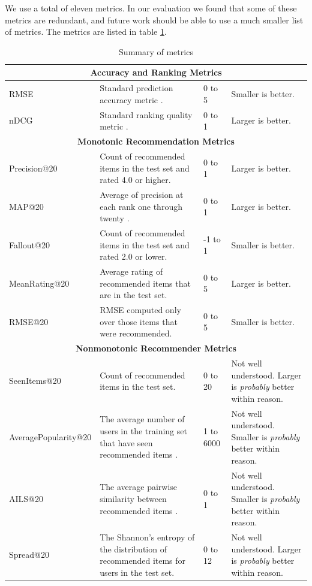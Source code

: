\documentclass[letterpaper]{sig-alternate}
\begin{document}
  We use a total of eleven metrics.
  In our evaluation we found that some of these metrics are redundant, and future work should be able to use a much smaller list of metrics.
  The metrics are listed in table \ref{tbl:metrics}.
  \begin{table}[ht!]
    \centering
    \begin{tabular}{|p{7em}|p{20em}|p{4em}|p{18em}|}
      \hline
      \multicolumn{4}{|c|}{{\bf Accuracy and Ranking Metrics}} \\\hline
      RMSE                   & Standard prediction accuracy metric \cite{handbook}. & 0 to 5 & Smaller is better. \\\hline
      nDCG                   & Standard ranking quality metric \cite{handbook}. & 0 to 1 & Larger is better. \\\hline
      \hline
      \multicolumn{4}{|c|}{{\bf Monotonic Recommendation Metrics}} \\\hline
      Precision@20           & Count of recommended items in the test set and rated 4.0 or higher\footnotemark[1] \cite{handbook}. & 0 to 1 & Larger is better. \\\hline
      MAP@20                 & Average of precision at each rank one through twenty \cite{manning2008introduction}. & 0 to 1 & Larger is better.\\\hline
      Fallout@20             & Count of recommended items in the test set and rated 2.0 or lower\footnotemark[1] \cite{handbook}. & -1 to 1 & Smaller is better. \\\hline
      MeanRating@20          & Average rating of recommended items that are in the test set.& 0 to 5 & Larger is better. \\\hline
      RMSE@20                & RMSE computed only over those items that were recommended.& 0 to 5 & Smaller is better. \\\hline
      \hline
      \multicolumn{4}{|c|}{{\bf Nonmonotonic Recommender Metrics}} \\\hline
      SeenItems@20           & Count of recommended items in the test set. & 0 to 20 & Not well understood. \newline Larger is \emph{probably} better within reason. \\\hline
      Average\-Popularity@20 & The average number of users in the training set that have seen recommended items \cite{zieglerDiversity}.& 1 to 6000 & Not well understood. \newline Smaller is \emph{probably} better within reason. \\\hline
      AILS@20                & The average pairwise similarity between recommended items \cite{zieglerDiversity}. & 0 to 1 & Not well understood. \newline  Smaller is \emph{probably} better within reason. \\\hline
      Spread@20              & The Shannon's entropy of the distribution of recommended items for users in the test set. & 0 to 12 & Not well understood. \newline Larger is \emph{probably} better within reason. \\\hline
    \end{tabular}
    \caption{Summary of metrics}
    \label{tbl:metrics}
  \end{table}
\end{document}
